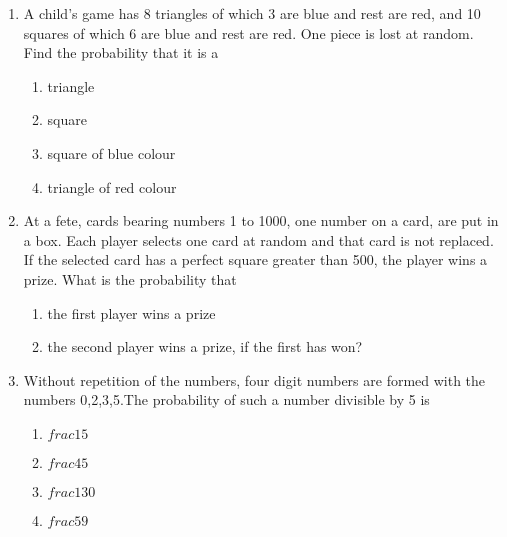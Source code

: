 \begin{enumerate}
\item A child's game has 8 triangles of which 3 are blue and rest are red, and 10 squares of which 6 are blue and rest are red. One piece is lost at random. Find the probability that it is a
\begin{enumerate}
\item triangle 
\item square 
\item square of blue colour 
\item triangle of red colour           
\end{enumerate}
\solution

\item At a fete, cards bearing numbers 1 to 1000, one number on a card, are put in a box. Each player selects one card at random and that card is not replaced. If the selected card has a perfect square greater than 500, the player wins a prize. What is the probability that 
\begin{enumerate}
\item the first player wins a prize
\item the second player wins a prize, if the first has won?
\end{enumerate}
\solution

\item Without repetition of the numbers, four digit numbers are formed with the numbers 0,2,3,5.The probability of such a number divisible by 5 is
\begin{enumerate}
\item $frac{1}{5}$
\item $frac{4}{5}$
\item $frac{1}{30}$ 
\item $frac{5}{9}$           
\end{enumerate}
\solution

\end{enumerate}

